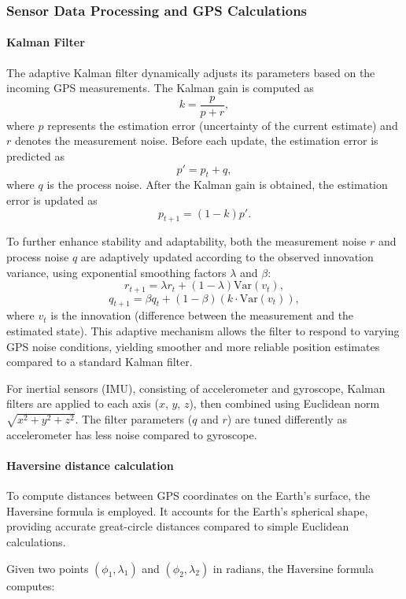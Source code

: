 \subsubsection{Sensor Data Processing and GPS Calculations}

\paragraph{Kalman Filter}
The adaptive Kalman filter dynamically adjusts its parameters based on the incoming GPS measurements. 
The Kalman gain is computed as 
\[
k = \frac{p}{p + r},
\]
where \( p \) represents the estimation error (uncertainty of the current estimate) and \( r \) denotes the measurement noise. 
Before each update, the estimation error is predicted as 
\[
p' = p_t + q,
\]
where \( q \) is the process noise. 
After the Kalman gain is obtained, the estimation error is updated as 
\[
p_{t+1} = (1 - k)p'.
\]

To further enhance stability and adaptability, both the measurement noise \( r \) and process noise \( q \) are adaptively updated according to the observed innovation variance, using exponential smoothing factors \( \lambda \) and \( \beta \):
\[
r_{t+1} = \lambda r_t + (1 - \lambda)\mathrm{Var}(v_t),
\]
\[
q_{t+1} = \beta q_t + (1 - \beta)(k \cdot \mathrm{Var}(v_t)),
\]
where \( v_t \) is the innovation (difference between the measurement and the estimated state). 
This adaptive mechanism allows the filter to respond to varying GPS noise conditions, yielding smoother and more reliable position estimates compared to a standard Kalman filter. 


For inertial sensors (IMU), consisting of accelerometer and gyroscope, Kalman filters are applied to each axis ($x$, $y$, $z$), then combined using Euclidean norm $\sqrt{x^2 + y^2 + z^2}$. The filter parameters ($q$ and $r$) are tuned differently as accelerometer has less noise compared to gyroscope. 

\paragraph{Haversine distance calculation}

To compute distances between GPS coordinates on the Earth's surface, the Haversine formula is employed. It accounts for the Earth's spherical shape, providing accurate great-circle distances compared to simple Euclidean calculations.

Given two points $(\phi_1, \lambda_1)$ and $(\phi_2, \lambda_2)$ in radians, the Haversine formula computes:

